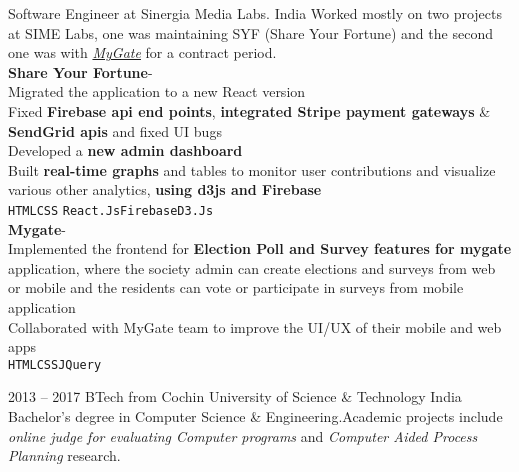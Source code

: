 \documentclass[9pt]{developercv} %
\begin{document}
\begin{entrylist}
		{Software Engineer}
		{at}
		{Sinergia Media Labs.}
		{India}
		{
			Worked mostly on two projects at SIME Labs, one was maintaining SYF (Share Your Fortune) and the second one was with \href{https://mygate.com/}{\emph{MyGate}} for a contract period.\smallskip\\
			\textbf{Share Your Fortune}\;-\;{\footnotesize\textcolor{darkgray}{crowdfunding website for social causes.}}\\
  				\faCaretRight\:Migrated the application to a new React version\\
  				\faCaretRight\:Fixed \textbf{Firebase api end points}, \textbf{integrated Stripe payment gateways} \& \textbf{SendGrid apis} and fixed UI bugs\\
  				\faCaretRight\: Developed a \textbf{new admin dashboard}\\
				\faCaretRight\: Built \textbf{real-time graphs} and tables to monitor user contributions and visualize various other analytics, \textbf{using d3js and Firebase}\\
			\texttt{HTML}\slashsep\texttt{CSS}
			\slashsep\texttt{React.Js}\slashsep\texttt{Firebase}\slashsep\texttt{D3.Js}\smallskip\\
			\textbf{Mygate}\;-\;{\footnotesize\textcolor{darkgray}{Security and community management solutions for gated communities.}}\\
  				\faCaretRight\: Implemented the frontend for \textbf{Election Poll and Survey features for mygate} application, where the society admin can create elections and surveys from web or mobile and the residents can vote or participate in surveys from mobile application \\
			\faCaretRight\: Collaborated with MyGate team to improve the UI/UX of their mobile and web apps\\
			\texttt{HTML}\slashsep\texttt{CSS}\slashsep\texttt{JQuery}
		}
\end{entrylist}



\begin{entrylist}
	\entry
		{2013 -- 2017}
		{BTech}
		{from}
		{Cochin University of Science \& Technology}
		{India}
		{Bachelor's degree in Computer Science \& Engineering.Academic projects include \emph{online judge for evaluating Computer programs} and \emph{Computer Aided Process Planning} research.}
	
\end{entrylist}

\smallskip\\


\end{document}
